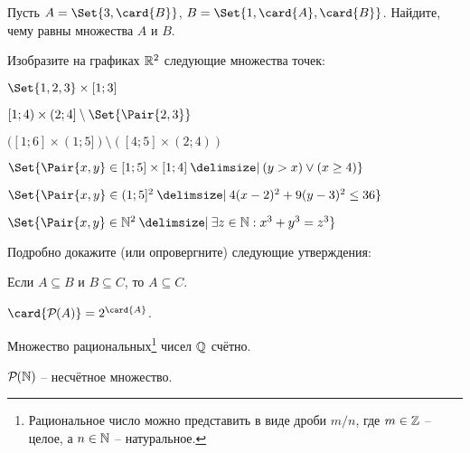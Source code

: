 \documentclass[a4paper,12pt]{article}
\begin{document}
\begin{tasks}
    \item Пусть $A = \Set{3, \card{B}}$, $B = \Set{1, \card{A}, \card{B}}$.
    Найдите, чему равны множества $A$ и $B$.


    \item Изобразите на графиках $\mathbb{R}^2$ следующие множества точек:

    \begin{multicols}{2}
    \begin{subtasks}
        \item $\Set{1,2,3} \times [1; 3]$
        \item $[1; 4) \times (2; 4] \setminus \Set{\Pair{2, 3}}$
        \item $([1; 6] \times (1; 5]) \setminus ([4; 5] \times (2; 4))$
        \item $\Set{\Pair{x, y} \in [1; 5] \times [1; 4] \given (y > x) \lor (x \geq 4)}$
        \item $\Set{\Pair{x, y} \in (1;5]^2 \given 4(x-2)^2 + 9(y-3)^2 \leq 36}$
        \item $\Set{\Pair{x, y} \in \Natural^2 \given \exists z \in \Natural : x^3 + y^3 = z^3}$
    \end{subtasks}
    \end{multicols}


    \item Подробно докажите (или опровергните) следующие утверждения:

    \begin{subtasks}
        \item Если $A \subseteq B$ и $B \subseteq C$, то $A \subseteq C$.
        \item $\card{\powerset{A}} = 2^{\card{A}}$.
        \item Множество рациональных\footnote{Рациональное число можно представить в виде дроби $m / n$, где $m \in \mathbb{Z}$ \--- целое, а $n \in \mathbb{N}$ \--- натуральное.} чисел $\mathbb{Q}$ счётно.
        \item $\mathcal{P}\mkern-1mu({\mathbb{N}})$ \--- несчётное множество.
    \end{subtasks}

\end{tasks}
\end{document}
